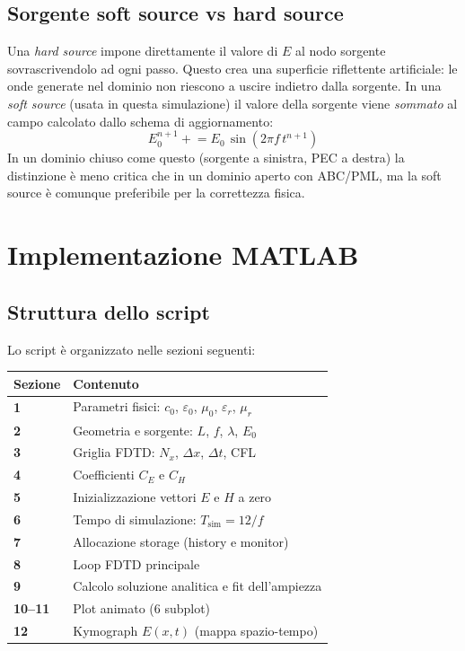 \documentclass[a4paper, 11pt]{article}
\newcommand{\eps}{\varepsilon}
\newcommand{\muu}{\mu}
\newcommand{\dx}{\Delta x}
\newcommand{\dt}{\Delta t}
\newcommand{\En}[2]{E_{#1}^{#2}}
\begin{document}
\subsection{Sorgente soft source vs hard source}

Una \emph{hard source} impone direttamente il valore di $E$ al nodo sorgente
sovrascrivendolo ad ogni passo. Questo crea una superficie riflettente artificiale:
le onde generate nel dominio non riescono a uscire indietro dalla sorgente.
In una \emph{soft source} (usata in questa simulazione) il valore della sorgente
viene \emph{sommato} al campo calcolato dallo schema di aggiornamento:
\[
    \En{0}{n+1} \mathrel{+}= E_0\,\sin(2\pi f\, t^{n+1})
\]
In un dominio chiuso come questo (sorgente a sinistra, PEC a destra) la
distinzione è meno critica che in un dominio aperto con ABC/PML, ma la soft
source è comunque preferibile per la correttezza fisica.

\section{Implementazione MATLAB}

\subsection{Struttura dello script}

Lo script è organizzato nelle sezioni seguenti:

\begin{center}
\begin{tabularx}{\linewidth}{>{\bfseries}l X}
\toprule
Sezione & Contenuto \\
\midrule
1 & Parametri fisici: $c_0$, $\eps_0$, $\muu_0$, $\eps_r$, $\muu_r$ \\
2 & Geometria e sorgente: $L$, $f$, $\lambda$, $E_0$ \\
3 & Griglia FDTD: $N_x$, $\dx$, $\dt$, CFL \\
4 & Coefficienti $C_E$ e $C_H$ \\
5 & Inizializzazione vettori $E$ e $H$ a zero \\
6 & Tempo di simulazione: $T_{\text{sim}} = 12/f$ \\
7 & Allocazione storage (history e monitor) \\
8 & Loop FDTD principale \\
9 & Calcolo soluzione analitica e fit dell'ampiezza \\
10--11 & Plot animato (6 subplot) \\
12 & Kymograph $E(x,t)$ (mappa spazio-tempo) \\
\bottomrule
\end{tabularx}
\end{center}
\end{document}
